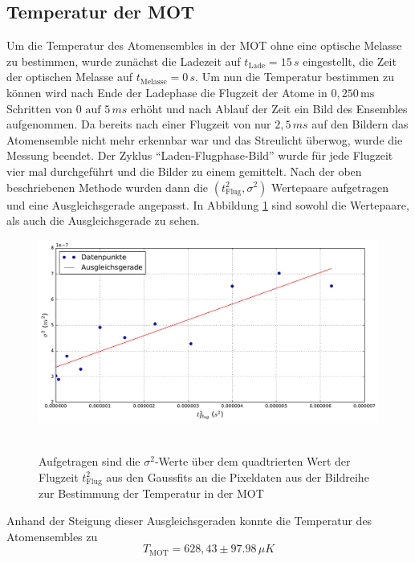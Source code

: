 \documentclass[twoside,colorback,accentcolor=tud4c,11pt]{tudreport}
\begin{document}
\subsection{Temperatur der MOT}\label{subsec:tempMOT}
Um die Temperatur des Atomensembles in der MOT ohne eine optische Melasse zu bestimmen, wurde zunächst die Ladezeit auf $t_{\text{Lade}}=15\,\si{s}$ eingestellt, die Zeit der optischen Melasse auf $t_{\text{Melasse}}=0\,\si{s}$. Um nun die Temperatur bestimmen zu können wird nach Ende der Ladephase die Flugzeit der Atome in $0,250\,\si{\ms}$ Schritten von $0\text{ auf }5\,\si{ms}$ erhöht und nach Ablauf der Zeit ein Bild des Ensembles aufgenommen. Da bereits nach einer Flugzeit von nur $2,5\,\si{ms}$ auf den Bildern das Atomensemble nicht mehr erkennbar war und das Streulicht überwog, wurde die Messung beendet. Der Zyklus "`Laden-Flugphase-Bild"' wurde für jede Flugzeit vier mal durchgeführt und die Bilder zu einem gemittelt. Nach der oben beschriebenen Methode wurden dann die $(t_{\text{Flug}}^2,\sigma^2)$ Wertepaare aufgetragen und eine Ausgleichsgerade angepasst. In Abbildung \ref{tmot} sind sowohl die Wertepaare, als auch die Ausgleichsgerade zu sehen.
\begin{figure}[H]
\centering
   	\begin{minipage}[b]{0.85\textwidth}
   	\includegraphics[width=\textwidth]{graphics/tempmot.pdf}\
   	\end{minipage}
\caption{Aufgetragen sind die $\sigma^2$-Werte über dem quadtrierten Wert der Flugzeit $t_{\text{Flug}}^2$ aus den Gaussfits an die Pixeldaten aus der Bildreihe zur Bestimmung der Temperatur in der MOT}\label{tmot}	
\end{figure}
Anhand der Steigung dieser Ausgleichsgeraden konnte die Temperatur des Atomensembles zu 
\begin{equation}\label{eq:tempMOT}
T_{\text{MOT}}=628,43\pm 97.98\,\si{\mu K}
\end{equation}
\end{document}
